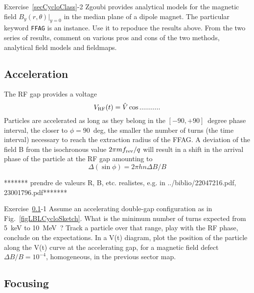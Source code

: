 \smallskip
\noindent {\small $\bullet$} Exercise~\ref{secCycloClass}-2 
Zgoubi provides analytical models 
 for the magnetic field ${B_y(r,\theta)|_{y=0}}$ in the median plane of a dipole magnet. 
The particular keyword \verb|FFAG| is an instance.  Use it to repoduce the results above. 
From the two series of results, comment on various pros and cons of the two methods, analytical field models and 
fieldmaps.


\subsection{Acceleration}\label{secCycloAccel}


The RF gap provides a voltage  
\begin{equation}
\label{EqRCyclo}
V_{\rm RF}(t) =\hat V \cos ........... 
\end{equation}
Particles are accelerated as long as they belong in the $[-90,+90]$~degree phase interval, 
the closer to $\phi=90$~deg, the smaller the number of turns 
(the time interval) necessary to reach the extraction radius of the FFAG.
A deviation of the field B from the isochronous value $2\pi m f_{\rm rev}/q$
will result in a  shift in the arrival phase of the particle at the RF gap amounting to 
\begin{equation}
\label{EqPFPhaseCyclo}
\Delta (\sin \phi) = 2\pi h n \Delta B/B
\end{equation}

 ******* prendre de valeurs R, B, etc. realistes, e.g. in ../biblio/22047216.pdf, 23001796.pdf*******

\smallskip
\noindent {\small $\bullet$} Exercise~\ref{secCycloAccel}-1 
Assume an accelerating double-gap  configuration as in Fig.~\ref{figLBLCycloSketch}. 
What is the minimum number of turns  expected  from 5~keV to 10~MeV~? Track a particle over that range, 
play with the RF phase, conclude on the  expectations. 
In a V(t) diagram, plot  the position  of the particle along the V(t) curve at the 
accelerating gap, for a magnetic field defect 
$\Delta B/B= 10^{-4}$, homogeneous, in the previous sector  map. 




\subsection{Focusing  \label{secCycloFocus}}


